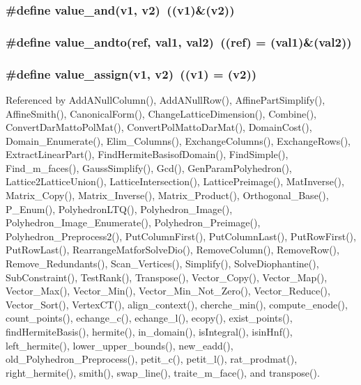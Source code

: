 \subsubsection{\setlength{\rightskip}{0pt plus 5cm}\#define value\_\-and(v1, v2)\ ((v1)\&(v2))}\label{arithmetique_8h_a40}


\subsubsection{\setlength{\rightskip}{0pt plus 5cm}\#define value\_\-andto(ref, val1, val2)\ ((ref) = (val1)\&(val2))}\label{arithmetique_8h_a59}


\subsubsection{\setlength{\rightskip}{0pt plus 5cm}\#define value\_\-assign(v1, v2)\ ((v1)  = (v2))}\label{arithmetique_8h_a11}




Referenced by Add\-ANull\-Column(), Add\-ANull\-Row(), Affine\-Part\-Simplify(), Affine\-Smith(), Canonical\-Form(), Change\-Lattice\-Dimension(), Combine(), Convert\-Dar\-Matto\-Pol\-Mat(), Convert\-Pol\-Matto\-Dar\-Mat(), Domain\-Cost(), Domain\_\-Enumerate(), Elim\_\-Columns(), Exchange\-Columns(), Exchange\-Rows(), Extract\-Linear\-Part(), Find\-Hermite\-Basisof\-Domain(), Find\-Simple(), Find\_\-m\_\-faces(), Gauss\-Simplify(), Gcd(), Gen\-Param\-Polyhedron(), Lattice2Lattice\-Union(), Lattice\-Intersection(), Lattice\-Preimage(), Mat\-Inverse(), Matrix\_\-Copy(), Matrix\_\-Inverse(), Matrix\_\-Product(), Orthogonal\_\-Base(), P\_\-Enum(), Polyhedron\-LTQ(), Polyhedron\_\-Image(), Polyhedron\_\-Image\_\-Enumerate(), Polyhedron\_\-Preimage(), Polyhedron\_\-Preprocess2(), Put\-Column\-First(), Put\-Column\-Last(), Put\-Row\-First(), Put\-Row\-Last(), Rearrange\-Matfor\-Solve\-Dio(), Remove\-Column(), Remove\-Row(), Remove\_\-Redundants(), Scan\_\-Vertices(), Simplify(), Solve\-Diophantine(), Sub\-Constraint(), Test\-Rank(), Transpose(), Vector\_\-Copy(), Vector\_\-Map(), Vector\_\-Max(), Vector\_\-Min(), Vector\_\-Min\_\-Not\_\-Zero(), Vector\_\-Reduce(), Vector\_\-Sort(), Vertex\-CT(), align\_\-context(), cherche\_\-min(), compute\_\-enode(), count\_\-points(), echange\_\-c(), echange\_\-l(), ecopy(), exist\_\-points(), find\-Hermite\-Basis(), hermite(), in\_\-domain(), is\-Integral(), isin\-Hnf(), left\_\-hermite(), lower\_\-upper\_\-bounds(), new\_\-eadd(), old\_\-Polyhedron\_\-Preprocess(), petit\_\-c(), petit\_\-l(), rat\_\-prodmat(), right\_\-hermite(), smith(), swap\_\-line(), traite\_\-m\_\-face(), and transpose().

